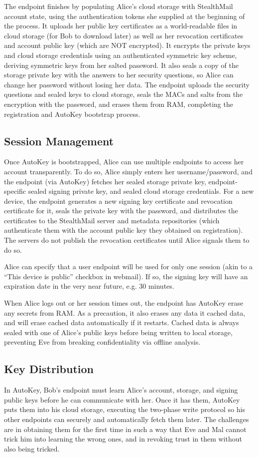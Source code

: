 The endpoint finishes by populating Alice’s cloud storage with StealthMail account state, using the authentication tokens she supplied at the beginning of the process.  It uploads her public key certificates as a world-readable files in cloud storage (for Bob to download later) as well as her revocation certificates and account public key (which are NOT encrypted).  It encrypts the private keys and cloud storage credentials using an authenticated symmetric key scheme, deriving symmetric keys from her salted password.  It also seals a copy of the storage private key with the answers to her security questions, so Alice can change her password without losing her data.  The endpoint uploads the security questions and sealed keys to cloud storage, seals the MACs and salts from the encryption with the password, and erases them from RAM, completing the registration and AutoKey bootstrap process.

\subsection{Session Management}
Once AutoKey is bootstrapped, Alice can use multiple endpoints to access her account transparently.  To do so, Alice simply enters her username/password, and the endpoint (via AutoKey) fetches her sealed storage private key, endpoint-specific sealed signing private key, and sealed cloud storage credentials.  For a new device, the endpoint generates a new signing key certificate and revocation certificate for it, seals the private key with the password, and distributes the certificates to the StealthMail server and metadata repositories (which authenticate them with the account public key they obtained on registration).  The servers do not publish the revocation certificates until Alice signals them to do so.

Alice can specify that a user endpoint will be used for only one session (akin to a ``This device is public'' checkbox in webmail).  If so, the signing key will have an expiration date in the very near future, e.g. 30 minutes.

When Alice logs out or her session times out, the endpoint has AutoKey erase any secrets from RAM.  As a precaution, it also erases any data it cached data, and will erase cached data automatically if it restarts. Cached data is always sealed with one of Alice's public keys before being written to local storage, preventing Eve from breaking confidentiality via offline analysis.

\subsection{Key Distribution}
In AutoKey, Bob's endpoint must learn Alice's account, storage, and signing public keys before he can communicate with her.  Once it has them, AutoKey puts them into his cloud storage, executing the two-phase write protocol so his other endpoints can securely and automatically fetch them later.  The challenges are in obtaining them for the first time in such a way that Eve and Mal cannot trick him into learning the wrong ones, and in revoking trust in them without also being tricked.

